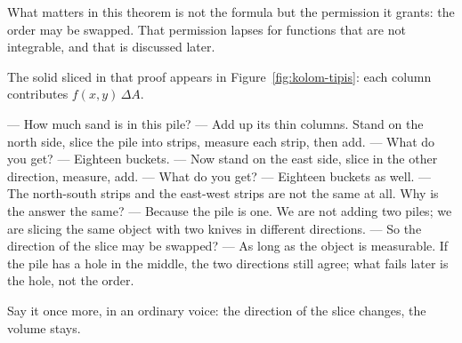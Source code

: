 What matters in this theorem is not the formula but the permission it grants: the order may
be swapped. That permission lapses for functions that are not integrable, and that is
discussed later.

The solid sliced in that proof appears in Figure~\ref{fig:kolom-tipis}:
each column contributes $f(x,y)\,\Delta A$.

\begin{bacakeras}
--- How much sand is in this pile?
--- Add up its thin columns. Stand on the north side, slice the pile into
strips, measure each strip, then add.
--- What do you get?
--- Eighteen buckets.
--- Now stand on the east side, slice in the other direction, measure, add.
--- What do you get?
--- Eighteen buckets as well.
--- The north-south strips and the east-west strips are not the same at all. Why
is the answer the same?
--- Because the pile is one. We are not adding two piles; we are slicing
the same object with two knives in different directions.
--- So the direction of the slice may be swapped?
--- As long as the object is measurable. If the pile has a hole in the middle, the two
directions still agree; what fails later is the hole, not the order.

Say it once more, in an ordinary voice: the direction of the slice changes, the volume stays.
\end{bacakeras}

